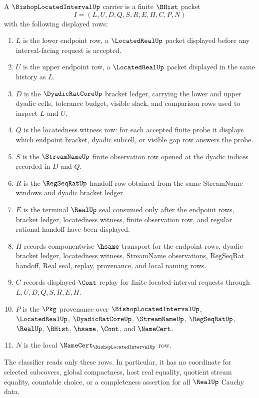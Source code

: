 \begin{definition}
\label{def:bishop-located-interval-carrier}
A $\BishopLocatedIntervalUp$ carrier is a finite $\BHist$ packet
$$
I=(L,U,D,Q,S,R,E,H,C,P,N)
$$
with the following displayed rows:
\begin{enumerate}
\item $L$ is the lower endpoint row, a $\LocatedRealUp$ packet displayed before any interval-facing request is accepted.
\item $U$ is the upper endpoint row, a $\LocatedRealUp$ packet displayed in the same history as $L$.
\item $D$ is the $\DyadicRatCoreUp$ bracket ledger, carrying the lower and upper dyadic cells, tolerance budget, visible slack, and comparison rows used to inspect $L$ and $U$.
\item $Q$ is the locatedness witness row: for each accepted finite probe it displays which endpoint bracket, dyadic subcell, or visible gap row answers the probe.
\item $S$ is the $\StreamNameUp$ finite observation row opened at the dyadic indices recorded in $D$ and $Q$.
\item $R$ is the $\RegSeqRatUp$ handoff row obtained from the same StreamName windows and dyadic bracket ledger.
\item $E$ is the terminal $\RealUp$ seal consumed only after the endpoint rows, bracket ledger, locatedness witness, finite observation row, and regular rational handoff have been displayed.
\item $H$ records componentwise $\hsame$ transport for the endpoint rows, dyadic bracket ledger, locatedness witness, StreamName observations, RegSeqRat handoff, Real seal, replay, provenance, and local naming rows.
\item $C$ records displayed $\Cont$ replay for finite located-interval requests through $L,U,D,Q,S,R,E,H$.
\item $P$ is the $\Pkg$ provenance over $\BishopLocatedIntervalUp$, $\LocatedRealUp$, $\DyadicRatCoreUp$, $\StreamNameUp$, $\RegSeqRatUp$, $\RealUp$, $\BHist$, $\hsame$, $\Cont$, and $\NameCert$.
\item $N$ is the local $\NameCert_{\BishopLocatedIntervalUp}$ row.
\end{enumerate}
The classifier reads only these rows. In particular, it has no coordinate for selected subcovers, global compactness, host real equality, quotient stream equality, countable choice, or a completeness assertion for all $\RealUp$ Cauchy data.
\end{definition}

